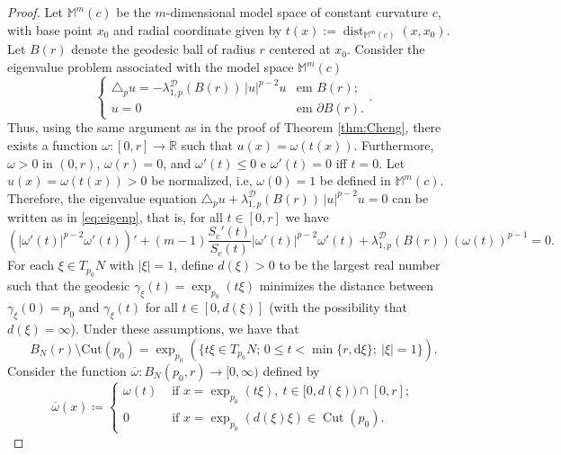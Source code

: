 \documentclass{article}
\begin{document}
\begin{proof}
Let $\mathbb{M}^m(c)$ be the $m$-dimensional model space of constant curvature $c$, with base point $x_0$ and radial coordinate given by $t(x):=\operatorname{dist}_{\mathbb{M}^m(c)}(x,x_0).$
Let $B(r)$ denote the geodesic ball of radius $r$ centered at $x_0$. Consider the eigenvalue problem associated with the model space $\mathbb{M}^m(c)$
\begin{equation}\label{eq:p-eig-modelo2}
\begin{cases}
 \triangle_p u =  - \lambda_{1,p}^{\mathcal{D}}(B(r))\,|u |^{p-2}u 
& \text{em } B(r);\\
u  =  0 & \text{em } \partial B(r).
\end{cases}.
\end{equation}
Thus, using the same argument as in the proof of Theorem \ref{thm:Cheng}, there
exists a function $\omega\colon [0,r] \to \mathbb{R}$ such that
$u(x) = \omega(t(x))$. Furthermore, $\omega > 0$ in $(0,r)$, $\omega(r) = 0$,
and $\omega'(t) \leq 0$ e $\omega'(t) = 0$ iff $t=0$. Let $u(x) = \omega(t(x)) > 0$ be normalized, i.e, $\omega(0)=1$ be defined in $\mathbb{M}^m(c)$.
Therefore, the eigenvalue equation $\triangle_p u + \lambda_{1,p}^{\mathcal{D}}(B(r))\,|u|^{p-2}u = 0$ can be written as in \eqref{eq:eigenp}, that is, for all $t \in [0,r]$ we have
\begin{equation}\label{eq:eigenp2}
   \left( |\omega'(t)|^{p-2} \omega'(t) \right)' + (m-1) \frac{S_{c}'(t)}{S_{c}(t)} |\omega'(t)|^{p-2} \omega'(t) + \lambda_{1,p}^{\mathcal{D}}(B(r))  (\omega(t))^{p-1}=0.
\end{equation}
For each $\xi \in T_{p_0}N$ with $|\xi|=1$, define $d(\xi)>0$ to be the largest real number such that the geodesic $\gamma_\xi(t)=\exp_{p_0}(t\xi)$ minimizes the distance between $\gamma_\xi(0)=p_0$ and $\gamma_\xi(t)$ for all $t \in [0,d(\xi)]$ (with the possibility that $d(\xi)=\infty$). Under these assumptions, we have that
\[ B_N(r) \setminus \mathrm{Cut}(p_0) = \exp_{p_0} ( \{ t \xi \in T_{p_0}N; \,  0 \leq t < \min \{r,\text{d}\xi \}; \ | \xi |=1 \} ). \]
Consider the function $\overline{\omega} \colon B_N(p_0,r) \to [0,\infty)$ defined by
\begin{equation}\label{modelfunction}
\overline{\omega}(x) \coloneqq \begin{cases}
\omega(t) & \text { if } x=\exp_{p_0}(t \xi), \ t \in[0, d(\xi)) \cap[0, r]; \\
0 & \text { if } x=\exp_{p_0}(d(\xi)\xi) \in \operatorname{Cut}(p_0).
\end{cases}

\end{equation}
\end{proof}
\end{document}
